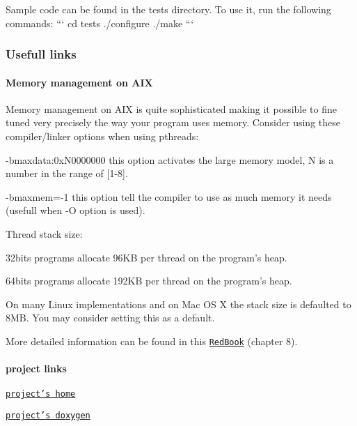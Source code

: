 Sample code can be found in the {\ttfamily tests} directory. To use it, run the following commands\+: ``` cd tests ./configure ./make ```

\subsubsection*{Usefull links}

\paragraph*{Memory management on A\+I\+X}

Memory management on A\+I\+X is quite sophisticated making it possible to fine tuned very precisely the way your program uses memory. Consider using these compiler/linker options when using pthreads\+:
\begin{DoxyItemize}
\item -\/bmaxdata\+:0x\+N0000000 this option activates the large memory model, N is a number in the range of \mbox{[}1-\/8\mbox{]}.
\item -\/bmaxmem=-\/1 this option tell the compiler to use as much memory it needs (usefull when -\/\+O option is used).
\end{DoxyItemize}

Thread stack size\+:
\begin{DoxyItemize}
\item 32bits programs allocate 96\+K\+B per thread on the program's heap.
\item 64bits programs allocate 192\+K\+B per thread on the program's heap.
\end{DoxyItemize}

On many Linux implementations and on Mac O\+S X the stack size is defaulted to 8\+M\+B. You may consider setting this as a default.

More detailed information can be found in this \href{http://www.redbooks.ibm.com/redbooks/pdfs/sg245674.pdf}{\tt Red\+Book} (chapter 8).

\paragraph*{project links}


\begin{DoxyItemize}
\item \href{https://github.com/HerbertKoelman/cpp-pthread}{\tt project's home}
\item \href{http://herbertkoelman.github.io/cpp-pthread/doc/html/}{\tt project's doxygen}
\end{DoxyItemize}

